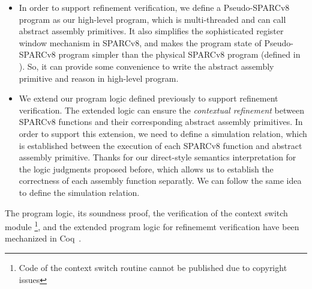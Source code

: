 \begin{itemize}
    \item 
    In order to support refinement verification, we define a 
    Pseudo-SPARCv8 program as our high-level program, which 
    is multi-threaded and can call abstract 
    assembly primitives. It also simplifies 
    the sophisticated register window mechanism in SPARCv8, 
    and makes the program state of Pseudo-SPARCv8 program 
    simpler than the physical SPARCv8 program 
    (defined in \Sec{\ref{sec:modeling}}). 
    So, it can provide some convenience 
    to write the abstract assembly primitive 
    and reason in high-level program. 
    
    \item
    We extend our program logic defined 
    previously to support refinement verification. 
    The extended logic can ensure 
    the {\it contextual refinement} between
    SPARCv8 functions and their corresponding 
    abstract assembly primitives. In order to support 
    this extension, we need to define a simulation 
    relation, which is established 
    between the execution of each SPARCv8 function 
    and abstract assembly primitive. 
    Thanks for our direct-style semantics interpretation 
    for the logic judgments proposed before, 
    which allows us to establish the correctness of 
    each assembly function separatly. 
    We can follow the same idea to define the  
    simulation relation.  

\end{itemize}
The program logic, its soundness proof, 
the verification of the context switch module
\footnote{Code of the context switch routine cannot 
be published due to copyright issues}, 
and the extended program logic for 
refinememt verification have been mechanized in 
Coq~\cite{coqimp}.


